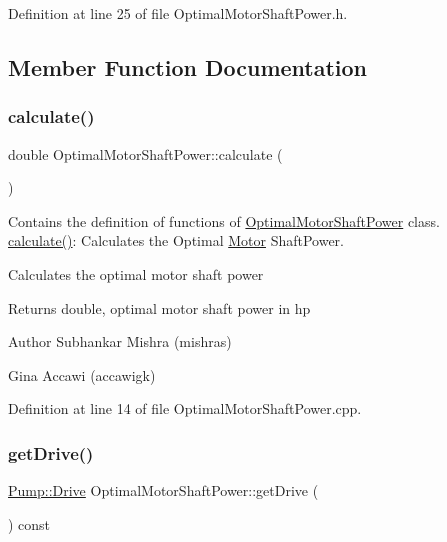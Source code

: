 Definition at line 25 of file Optimal\+Motor\+Shaft\+Power.\+h.



\subsection{Member Function Documentation}
\mbox{\label{class_optimal_motor_shaft_power_a34d47733928ae518fa6f3d08b7d8a12e}} 
\subsubsection{\texorpdfstring{calculate()}{calculate()}}
{\footnotesize\ttfamily double Optimal\+Motor\+Shaft\+Power\+::calculate (\begin{DoxyParamCaption}{ }\end{DoxyParamCaption})}



Contains the definition of functions of \hyperlink{class_optimal_motor_shaft_power}{Optimal\+Motor\+Shaft\+Power} class. \hyperlink{class_optimal_motor_shaft_power_a34d47733928ae518fa6f3d08b7d8a12e}{calculate()}\+: Calculates the Optimal \hyperlink{class_motor}{Motor} Shaft\+Power. 

Calculates the optimal motor shaft power \begin{DoxyReturn}{Returns}
double, optimal motor shaft power in hp
\end{DoxyReturn}
\begin{DoxyAuthor}{Author}
Subhankar Mishra (mishras) 

Gina Accawi (accawigk) 
\end{DoxyAuthor}


Definition at line 14 of file Optimal\+Motor\+Shaft\+Power.\+cpp.

\mbox{\label{class_optimal_motor_shaft_power_a23e1045bb2e3ee62205276cbbebbc3ad}} 
\subsubsection{\texorpdfstring{get\+Drive()}{getDrive()}}
{\footnotesize\ttfamily \hyperlink{class_pump_a32bf0ade131a11bb3b3fb374f638e983}{Pump\+::\+Drive} Optimal\+Motor\+Shaft\+Power\+::get\+Drive (\begin{DoxyParamCaption}{ }\end{DoxyParamCaption}) const\hspace{0.3cm}{\ttfamily [inline]}}

